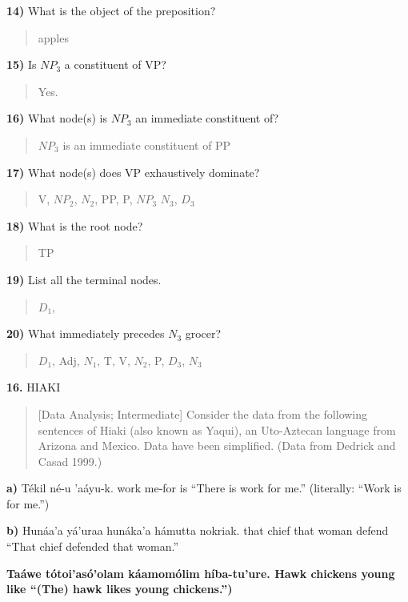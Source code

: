 \documentclass[11pt,notitlepage]{article}
\newcommand{\question}[2]{\textbf{#1.} #2}
\newcommand{\subquestion}[2]{\par\hspace{0.5cm} \textbf{#1)} #2}
\begin{document}
\subquestion{14}{What is the object of the preposition?}

\begin{quote}
  apples
\end{quote}

\subquestion{15}{Is $NP_3$ a constituent of VP?}

\begin{quote}
  Yes.
\end{quote}


\subquestion{16}{What node(s) is $NP_3$ an immediate constituent of?}

\begin{quote}
  $NP_3$ is an immediate constituent of PP
\end{quote}

\subquestion{17}{What node(s) does VP exhaustively dominate?}

\begin{quote}
  V, $NP_2$, $N_2$, PP, P, $NP_3$ $N_3$, $D_3$
\end{quote}

\subquestion{18}{What is the root node?}

\begin{quote}
  TP
\end{quote}

\subquestion{19}{List all the terminal nodes.}

\begin{quote}
$D_1$, 
\end{quote}

\subquestion{20}{What immediately precedes $N_3$ grocer?}

\begin{quote}
$D_1$, Adj, $N_1$, T, V, $N_2$, P, $D_3$, $N_3$ 
\end{quote}

\question{16}{HIAKI}
\begin{quote}
[Data Analysis; Intermediate]
Consider the data from the following sentences of Hiaki (also known as
Yaqui), an Uto-Aztecan language from Arizona and Mexico. Data have
been simplified. (Data from Dedrick and Casad 1999.)
\end{quote}

\subquestion{a}{Tékil né-u ’aáyu-k.
work me-for is
“There is work for me.” (literally: “Work is for me.”)}

\subquestion{b}{Hunáa’a yá’uraa hunáka’a hámutta nokriak. that chief
  that woman defend “That chief defended that woman.”}

\subquestion{Taáwe tótoi’asó’olam káamomólim híba-tu’ure. Hawk chickens young like
“(The) hawk likes young chickens.”}
\end{document}
